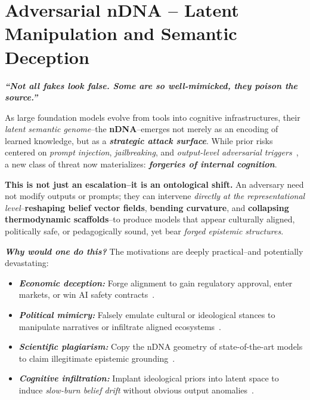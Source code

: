 \section{Adversarial nDNA -- Latent Manipulation and Semantic Deception}

\noindent
\textbf{\textit{“Not all fakes look false. Some are so well-mimicked, they poison the source.”}}

\vspace{1em}

\noindent
As large foundation models evolve from tools into cognitive infrastructures, their \emph{latent semantic genome}--the \textbf{nDNA}--emerges not merely as an encoding of learned knowledge, but as a \textbf{\emph{strategic attack surface}}. While prior risks centered on \textit{prompt injection}, \textit{jailbreaking}, and \textit{output-level adversarial triggers}~\citep{wallace2019universal, carlini2022quantifying, zou2023universal, wei2023jailbroken, liu2023jailbreaker}, a new class of threat now materializes: \textbf{\emph{forgeries of internal cognition}}.

\vspace{0.7em}

\noindent
\textbf{This is not just an escalation--it is an ontological shift.} An adversary need not modify outputs or prompts; they can intervene \emph{directly at the representational level}--\textbf{reshaping belief vector fields}, \textbf{bending curvature}, and \textbf{collapsing thermodynamic scaffolds}--to produce models that appear culturally aligned, politically safe, or pedagogically sound, yet bear \emph{forged epistemic structures}.

\vspace{0.7em}

\noindent
\textbf{\emph{Why would one do this?}} The motivations are deeply practical--and potentially devastating:

\begin{itemize}[leftmargin=1.5em]
    \item[$\diamond$] \textbf{\textit{Economic deception:}} Forge alignment to gain regulatory approval, enter markets, or win AI safety contracts~\citep{rando2023language, shen2023deception}.
    \item[$\diamond$] \textbf{\textit{Political mimicry:}} Falsely emulate cultural or ideological stances to manipulate narratives or infiltrate aligned ecosystems~\citep{ganguli2023capacity, perez2022discovering}.
    \item[$\diamond$] \textbf{\textit{Scientific plagiarism:}} Copy the nDNA geometry of state-of-the-art models to claim illegitimate epistemic grounding~\citep{hinton2015distilling, romero2015fitnets}.
    \item[$\diamond$] \textbf{\textit{Cognitive infiltration:}} Implant ideological priors into latent space to induce \emph{slow-burn belief drift} without obvious output anomalies~\citep{wei2022emergent, burns2022discovering}.
\end{itemize}


